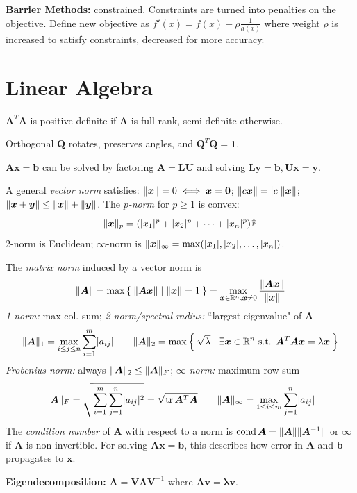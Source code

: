 \documentclass[twocolumn, 8pt]{extarticle}
\begin{document}
\textbf{Barrier Methods:} constrained. Constraints are turned into penalties on the objective.
Define new objective as $f'(x) = f(x) + \rho\frac{1}{h(x)}$ where weight $\rho$ is increased to satisfy constraints, decreased for more accuracy.

\section{Linear Algebra} %

$\bm A^T\bm A$ is positive definite if $\bm A$ is full rank, semi-definite otherwise.

Orthogonal $\bm Q$ rotates, preserves angles, and $\bm Q^T\bm Q = \bm 1$.

$\bm A\bm x = \bm b$ can be solved by factoring $\bm A = \bm L\bm U$ and solving $\bm L\bm y = \bm b, \bm U\bm x = \bm y$.

A general \textit{vector norm} satisfies: $\lVert\bm x\rVert = 0 \iff \bm x = \bm 0$; $\lVert c\bm x\rVert = \lvert c\rvert\lVert\bm x\rVert$; $\lVert\bm x + \bm y\rVert \leq \lVert\bm x\rVert + \lVert\bm y\rVert$.
The $p$\textit{-norm} for $p \geq 1$ is convex: $$\lVert\bm x\rVert_p = (\lvert x_1\rvert^p + \lvert x_2\rvert^p + \cdots + \lvert x_n\rvert^p)^{\frac{1}{p}}$$
2-norm is Euclidean; $\infty$-norm is $\lVert\bm x\rVert_\infty = \max(\lvert x_1\rvert, \lvert x_2\rvert, \dots, \lvert x_n\rvert)$.

The \textit{matrix norm} induced by a vector norm is
$$\lVert\bm A\rVert = \max\Set{\lVert\bm A\bm x\rVert | \lVert\bm x\rVert = 1} = \max _{\bm x \in \mathbb{R}^n, \bm x \neq 0}\frac{\lVert\bm A\bm x\rVert}{\lVert\bm x\rVert}$$
\textit{1-norm:} max col. sum; \textit{2-norm/spectral radius:} ``largest eigenvalue" of $\bm A$
$$\lVert\bm A\rVert_1 = \max_{i \leq j \leq n} \sum _{i = 1}^m \lvert a_{ij}\rvert \qquad \lVert\bm A\rVert_2 = \max\Set{\sqrt{\lambda} | \exists\bm x \in \mathbb{R}^n\text{ s.t. }\bm A^T\bm A\bm x = \lambda\bm x}$$
\textit{Frobenius norm:} always $\lVert\bm A\rVert_2 \leq \lVert\bm A\rVert_F$; $\infty$\textit{-norm:} maximum row sum
$$\lVert\bm A\rVert_F = \sqrt{\sum _{i = 1}^m\sum _{j = 1}^n \lvert a_{ij}\rvert^2} = \sqrt{\operatorname{tr} \bm A^T\bm A} \qquad \lVert\bm A\rVert_\infty = \max _{1 \leq i \leq m} \sum _{j = 1}^n \lvert a_{ij}\rvert$$
The \textit{condition number} of $\bm A$ with respect to a norm is $\operatorname{cond} \bm A = \lVert\bm A\rVert\lVert\bm A^{-1}\rVert$
or $\infty$ if $\bm A$ is non-invertible.
For solving $\bm A\bm x = \bm b$, this describes how error in $\bm A$ and $\bm b$ propagates to $\bm x$.

\textbf{Eigendecomposition:} $\bm A = \bm V\bm\Lambda\bm V^{-1}$ where $\bm A\bm v = \bm\lambda\bm v$.
\end{document}
